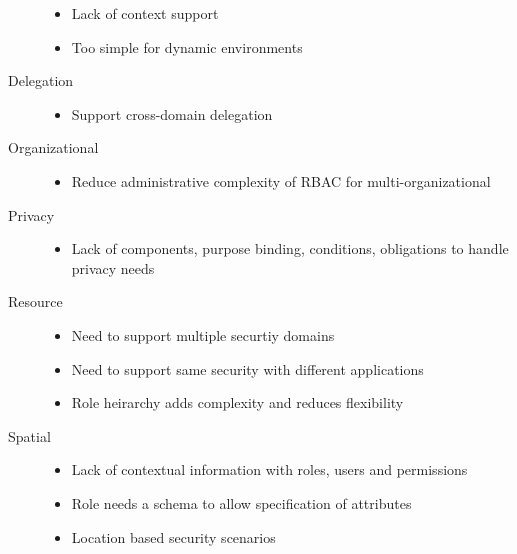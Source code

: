 \documentclass[letterpaper,10pt,english]{sphinxmanual}
\begin{document}
\begin{description}
\begin{itemize}
\item {} 
Lack of context support

\item {} 
Too simple for dynamic environments

\end{itemize}

\item[{Delegation}] \leavevmode\begin{itemize}
\item {} 
Support cross-domain delegation

\end{itemize}

\item[{Organizational}] \leavevmode\begin{itemize}
\item {} 
Reduce administrative complexity of RBAC for multi-organizational

\end{itemize}

\item[{Privacy}] \leavevmode\begin{itemize}
\item {} 
Lack of components, purpose binding, conditions, obligations to handle privacy needs

\end{itemize}

\item[{Resource}] \leavevmode\begin{itemize}
\item {} 
Need to support multiple securtiy domains

\item {} 
Need to support same security with different applications

\item {} 
Role heirarchy adds complexity and reduces flexibility

\end{itemize}

\item[{Spatial}] \leavevmode\begin{itemize}
\item {} 
Lack of contextual information with roles, users and permissions

\item {} 
Role needs a schema to allow specification of attributes

\item {} 
Location based security scenarios


\end{itemize}
\end{description}
\end{document}
